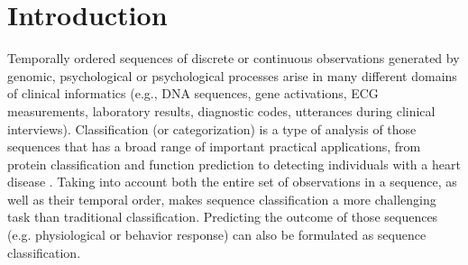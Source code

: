 \documentclass{amia_summit_2018}
\begin{document}
\section*{Introduction}
Temporally ordered sequences of discrete or continuous observations generated by genomic, psychological or psychological processes arise in many different domains of clinical informatics (e.g.,
DNA sequences, gene activations, ECG measurements, laboratory results, diagnostic codes, utterances during clinical interviews). Classification (or categorization) is a type of analysis of those
sequences that has a broad range of important practical applications, from protein classification \cite{yakhnenko2005discriminatively} and function prediction \cite{deshpande2002evaluation} to
detecting individuals with a heart disease \cite{wei2006semi}. Taking into account both the entire set of observations in a sequence, as well as their temporal order, makes sequence classification a
more challenging task than traditional classification. Predicting the outcome of those sequences (e.g. physiological or behavior response) can also be formulated as sequence classification.
\end{document}
